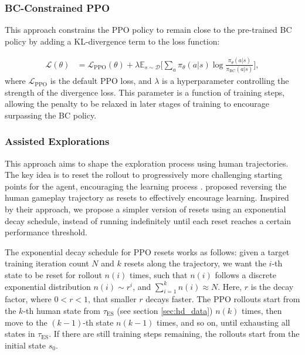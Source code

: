 \documentclass{article}
\begin{document}
\subsubsection{BC-Constrained PPO}
This approach constrains the PPO policy to remain close to the pre-trained BC 
policy by adding a KL-divergence term to the loss function:

\begin{align*}
      \mathcal{L}(\theta) 
      &= \mathcal{L}_{\text{PPO}}(\theta) +
      \lambda \mathbb{E}_{s \sim \mathcal{D}} \bigg[ \sum_{a} \pi_{\theta}(a | s) \log 
      \frac{\pi_{\theta}(a | s)}{\pi_{\text{BC}}(a | s)} \bigg],
\end{align*}
where $\mathcal{L}_{\text{PPO}}$ is the default PPO loss, and $\lambda$ is a 
hyperparameter controlling the strength of the divergence loss. This parameter 
is a function of training steps, allowing the penalty to be relaxed in later 
stages of training to encourage surpassing the BC policy.

\subsubsection{Assisted Explorations}
This approach aims to shape the exploration process using human trajectories. 
The key idea is to reset the rollout to progressively more challenging starting 
points for the agent, encouraging the learning process \cite{florensa2018reversecurriculumgenerationreinforcement}. 
\cite{salimans2018learningmontezumasrevengesingle} proposed reversing the human 
gameplay trajectory as resets to effectively encourage learning. Inspired by 
their approach, we propose a simpler version of resets using an exponential 
decay schedule, instead of running indefinitely until each reset reaches a 
certain performance threshold.

The exponential decay schedule for PPO resets works as follows: given a target 
training iteration count $N$ and $k$ resets along the trajectory, we want the 
$i$-th state to be reset for rollout $n(i)$ times, such that $n(i)$ follows a 
discrete exponential distribution $n(i) \sim r^i$, and $\sum_{i=1}^{k} n(i) 
\approx N$. Here, $r$ is the decay factor, where $0 < r < 1$, that smaller $r$ decays 
faster. The PPO rollouts start from the $k$-th human state from 
$\tau_{\text{ES}}$ (see section \ref{sec:hd_data}) $n(k)$ times, then move to 
the $(k-1)$-th state $n(k-1)$ times, and so on, until exhausting all states in 
$\tau_{\text{ES}}$. If there are still training steps remaining, the rollouts 
start from the initial state $s_0$.
\end{document}
